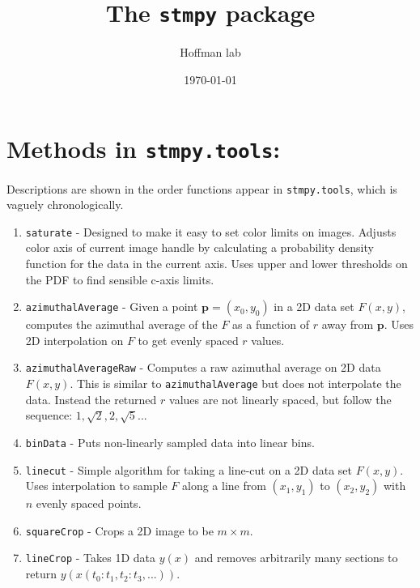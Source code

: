 \documentclass[11pt]{article}
\date{}
\begin{document}
\title{\vspace{-0.7cm}The \texttt{stmpy} package}
\date{\today}
\author{Hoffman lab} 
\maketitle




\section*{Methods in \texttt{stmpy.tools}:}

Descriptions are shown in the order functions appear in {\tt stmpy.tools}, which is vaguely chronologically.

\begin{enumerate}
\item {\tt saturate} - Designed to make it easy to set color limits on images. Adjusts color axis of current image handle by calculating a probability density function for the data in the current axis.  Uses upper and lower thresholds on the PDF to find sensible c-axis limits. 

\item {\tt azimuthalAverage} - Given a point $\mathbf{p}=(x_0,y_0)$ in a 2D data set $F(x,y)$, computes the azimuthal average of the $F$ as a function of $r$ away from $\mathbf{p}$. Uses 2D interpolation on $F$ to get evenly spaced $r$ values. 

\item {\tt azimuthalAverageRaw} - Computes a raw azimuthal average on 2D data $F(x,y)$.  This is similar to {\tt \small azimuthalAverage} but does not interpolate the data.  Instead the returned $r$ values are not linearly spaced, but follow the sequence: $1,\sqrt{2}, 2, \sqrt{5}...$

\item {\tt binData} - Puts non-linearly sampled data into linear bins.

\item {\tt linecut} - Simple algorithm for taking a line-cut on a 2D data set $F(x,y)$.  Uses interpolation to sample $F$ along a line from $(x_1,y_1)$ to $(x_2,y_2)$ with $n$ evenly spaced points.

\item {\tt squareCrop} - Crops a 2D image to be $m\times m$.

\item {\tt lineCrop} - Takes 1D data $y(x)$ and removes arbitrarily many sections to return $y(x(t_0:t_1, t_2:t_3, ...))$.


\end{enumerate}
\end{document}

